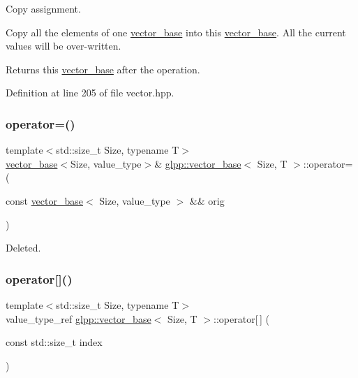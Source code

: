 Copy assignment. 

Copy all the elements of one \hyperlink{classglpp_1_1vector__base}{vector\+\_\+base} into this \hyperlink{classglpp_1_1vector__base}{vector\+\_\+base}. All the current values will be over-\/written.

\begin{DoxyReturn}{Returns}
this \hyperlink{classglpp_1_1vector__base}{vector\+\_\+base} after the operation. 
\end{DoxyReturn}


Definition at line 205 of file vector.\+hpp.

\mbox{\label{classglpp_1_1vector__base_a4fbb93fbc43aa6fb332104aa039991b2}} 
\subsubsection{\texorpdfstring{operator=()}{operator=()}\hspace{0.1cm}{\footnotesize\ttfamily [2/2]}}
{\footnotesize\ttfamily template$<$std\+::size\+\_\+t Size, typename T$>$ \\
\hyperlink{classglpp_1_1vector__base}{vector\+\_\+base}$<$Size, value\+\_\+type$>$\& \hyperlink{classglpp_1_1vector__base}{glpp\+::vector\+\_\+base}$<$ Size, T $>$\+::operator= (\begin{DoxyParamCaption}\item[{const \hyperlink{classglpp_1_1vector__base}{vector\+\_\+base}$<$ Size, value\+\_\+type $>$ \&\&}]{orig }\end{DoxyParamCaption})\hspace{0.3cm}{\ttfamily [delete]}}

Deleted. \mbox{\label{classglpp_1_1vector__base_aae72a315ce6ba266b7add4a43a531bb2}} 
\subsubsection{\texorpdfstring{operator[]()}{operator[]()}\hspace{0.1cm}{\footnotesize\ttfamily [1/2]}}
{\footnotesize\ttfamily template$<$std\+::size\+\_\+t Size, typename T$>$ \\
value\+\_\+type\+\_\+ref \hyperlink{classglpp_1_1vector__base}{glpp\+::vector\+\_\+base}$<$ Size, T $>$\+::operator\mbox{[}$\,$\mbox{]} (\begin{DoxyParamCaption}\item[{const std\+::size\+\_\+t}]{index }\end{DoxyParamCaption})\hspace{0.3cm}{\ttfamily [inline]}}



